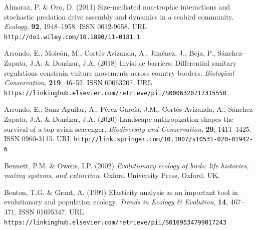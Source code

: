 \documentclass[12pt]{article}
\begin{document}
\begin{thebibliography}{87}
	\providecommand{\natexlab}[1]{#1}
	\providecommand{\url}[1]{\texttt{#1}}
	\providecommand{\urlprefix}{URL }
	
	Almaraz, P. \& Oro, D. (2011) {Size-mediated non-trophic interactions and
		stochastic predation drive assembly and dynamics in a seabird community}.
	\newblock \emph{Ecology}, \textbf{92}, 1948--1958.
	\newblock ISSN 0012-9658.
	\newline\urlprefix\url{http://doi.wiley.com/10.1890/11-0181.1}
	
	Arrondo, E., Mole{\'{o}}n, M., Cort{\'{e}}s-Avizanda, A., Jim{\'{e}}nez, J.,
	Beja, P., S{\'{a}}nchez-Zapata, J.A. \& Don{\'{a}}zar, J.A. (2018) {Invisible
		barriers: Differential sanitary regulations constrain vulture movements
		across country borders}.
	\newblock \emph{Biological Conservation}, \textbf{219}, 46--52.
	\newblock ISSN 00063207.
	\newline\urlprefix\url{https://linkinghub.elsevier.com/retrieve/pii/S0006320717315550}
	
	Arrondo, E., Sanz-Aguilar, A., P{\'{e}}rez-Garc{\'{i}}a, J.M.,
	Cort{\'{e}}s-Avizanda, A., S{\'{a}}nchez-Zapata, J.A. \& Don{\'{a}}zar, J.A.
	(2020) {Landscape anthropization shapes the survival of a top avian
		scavenger}.
	\newblock \emph{Biodiversity and Conservation}, \textbf{29}, 1411--1425.
	\newblock ISSN 0960-3115.
	\newline\urlprefix\url{http://link.springer.com/10.1007/s10531-020-01942-6}
	
	Bennett, P.M. \& Owens, I.P. (2002) \emph{{Evolutionary ecology of birds: life
			histories, mating systems, and extinction}}.
	\newblock Oxford University Press, Oxford, UK.
	
	Benton, T.G. \& Grant, A. (1999) {Elasticity analysis as an important tool in
		evolutionary and population ecology}.
	\newblock \emph{Trends in Ecology {\&} Evolution}, \textbf{14}, 467--471.
	\newblock ISSN 01695347.
	\newline\urlprefix\url{https://linkinghub.elsevier.com/retrieve/pii/S0169534799017243}
	

\end{thebibliography}
\end{document}
